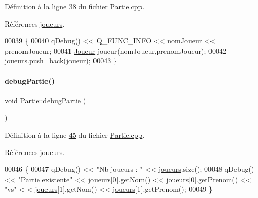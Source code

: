 Définition à la ligne \hyperlink{_partie_8cpp_source_l00038}{38} du fichier \hyperlink{_partie_8cpp_source}{Partie.\+cpp}.



Références \hyperlink{_partie_8h_source_l00019}{joueurs}.


\begin{DoxyCode}
00039 \{
00040     qDebug() << Q\_FUNC\_INFO << nomJoueur << prenomJoueur;
00041     \hyperlink{class_joueur}{Joueur} joueur(nomJoueur,prenomJoueur);
00042     \hyperlink{class_partie_a98fa2810599b3eb46d57df2b5836a3f4}{joueurs}.push\_back(joueur);
00043 \}
\end{DoxyCode}
\mbox{\label{class_partie_aea05906078462b32bf08a3172ab14328}} 
\paragraph{\texorpdfstring{debug\+Partie()}{debugPartie()}}
{\footnotesize\ttfamily void Partie\+::debug\+Partie (\begin{DoxyParamCaption}{ }\end{DoxyParamCaption})}



Définition à la ligne \hyperlink{_partie_8cpp_source_l00045}{45} du fichier \hyperlink{_partie_8cpp_source}{Partie.\+cpp}.



Références \hyperlink{_partie_8h_source_l00019}{joueurs}.


\begin{DoxyCode}
00046 \{
00047     qDebug() << \textcolor{stringliteral}{"Nb joueurs : "} << \hyperlink{class_partie_a98fa2810599b3eb46d57df2b5836a3f4}{joueurs}.size();
00048     qDebug() << \textcolor{stringliteral}{"Partie existente"} << \hyperlink{class_partie_a98fa2810599b3eb46d57df2b5836a3f4}{joueurs}[0].getNom() << \hyperlink{class_partie_a98fa2810599b3eb46d57df2b5836a3f4}{joueurs}[0].getPrenom() << \textcolor{stringliteral}{"vs"} <
      < \hyperlink{class_partie_a98fa2810599b3eb46d57df2b5836a3f4}{joueurs}[1].getNom() << \hyperlink{class_partie_a98fa2810599b3eb46d57df2b5836a3f4}{joueurs}[1].getPrenom();
00049 \}
\end{DoxyCode}
\mbox{\label{class_partie_ab5bb77bcbdb9a145016ebb4ff2bf6c38}} 
